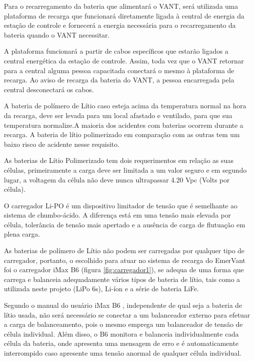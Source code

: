 Para o recarregamento da bateria que alimentará o VANT, será utilizada uma plataforma de recarga que funcionará diretamente ligada à  central de energia da estação de controle e fornecerá a energia necessária para o recarregamento da bateria quando o VANT necessitar.

A plataforma funcionará a partir de cabos específicos que estarão ligados a central energética da estação de controle. Assim, toda vez que o VANT retornar para a central alguma pessoa capacitada conectará o mesmo à plataforma de recarga. Ao aviso de recarga da bateria do VANT, a pessoa encarregada pela central desconectará os cabos.

A bateria de polímero de Lítio caso esteja acima da temperatura normal na hora da recarga, deve ser levada para um local afastado e ventilado, para que sua temperatura normalize.A maioria dos acidentes com baterias ocorrem durante a recarga. A bateria de lítio polimerizado em comparação com as outras tem um baixo risco de acidente nesse requisito. \cite{gibbs}

As baterias de Lítio Polimerizado tem dois requerimentos em relação as suas células, primeiramente a carga deve ser limitada a um valor seguro e em segundo lugar, a voltagem da célula não deve nunca ultrapassar 4.20 Vpc (Volts por célula). \cite{gibbs}

O carregador Li-PO é um dispositivo limitador de tensão que é semelhante ao sistema de chumbo-ácido. A diferença está em uma tensão mais elevada por célula, tolerância de tensão mais apertado e a ausência de carga de flutuação em plena carga.

As baterias de polímero de Lítio não podem ser carregadas por qualquer tipo de carregador, portanto, o escolhido para atuar no sistema de recarga do EmerVant foi o carregador iMax B6 (figura \ref{fig:carregador1}), se adequa de uma forma que carrega e balanceia adequadamente vários tipos de bateria de lítio, tais como a utilizada neste projeto (LiPo 6s), Li-íon e a série de bateria LiFe.




Segundo o manual do usuário iMax B6 \cite{ibmax}, independente de qual seja a bateria de lítio usada, não será necessário se conectar a um balanceador externo para efetuar a carga de balanceamento, pois o mesmo emprega um balanceador de tensão de célula individual. Além disso, o B6 monitora e balanceia individualmente cada célula da bateria, onde apresenta uma mensagem de erro e é automaticamente interrompido caso apresente uma tensão anormal de qualquer célula individual. 

